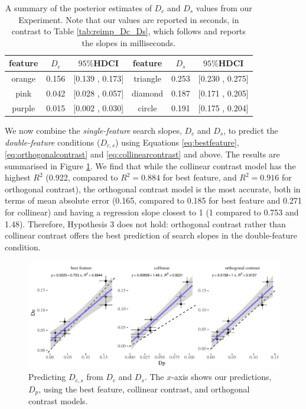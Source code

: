 \documentclass[preprint,12pt,authoryear]{elsarticle}
\begin{document}
\begin{table}[h]
\centering
\begin{tabular}{|c|cc||c|cc|} 
\hline
feature & $D_c$ & $95\%$HDCI &feature &$D_s$  &$95\%$HDCI \\
 \hline 
orange & 0.156 &  [0.139 ,  0.173] & triangle  &  0.253  & [0.230  , 0.275]\\
pink  &  0.042 &  [0.028 , 0.057] & diamond& 0.187 &  [0.171 ,  0.205]\\
purple & 0.015 &  [0.002  , 0.030] & circle & 0.191  & [0.175 , 0.204]\\
 \hline 
 \end{tabular}
\caption{A summary of the posterior estimates of $D_c$ and $D_s$ values from our Experiment. Note that our values are reported in seconds, in contrast to Table  \ref{tab:reimp_Dc_Ds}, which follows \citep{buetti2019predicting} and reports the slopes in milliseconds.}
\label{tab:new_Dc_Ds}
\end{table}

We now combine the \textit{single-feature} search slopes, $D_c$ and $D_s$, to predict the \textit{double-feature} conditions ($D_{c,s}$) using Equations \ref{eq:bestfeature},  \ref{eq:orthogonalcontrast} and \ref{eq:collinearcontrast} and above. The results are summarised in Figure \ref{fig:new:Dpe}. We find that while the collinear contrast model has the highest $R^2$ (0.922, compared to $R^2=0.884$ for best feature, and $R^2=0.916$ for orthogonal contrast), the orthogonal contrast model is the most accurate, both in terms of mean absolute error (0.165, compared to 0.185 for best feature and 0.271 for collinear) and having a regression slope closest to 1 (1 compared to 0.753 and 1.48). Therefore, Hypothesis 3 does not hold: orthogonal contrast rather than collinear contrast offers the best prediction of search slopes in the double-feature condition.  

\begin{figure}[ht]
\centering
\includegraphics[width=\textwidth]{../plots/Dpe.pdf}
\caption{Predicting $D_{c,s}$ from $D_c$ and $D_s$. The $x$-axis shows our predictions, $D_p$, using the best feature, collinear contrast, and orthogonal contrast models.}
\label{fig:new:Dpe}
\end{figure}
\end{document}
